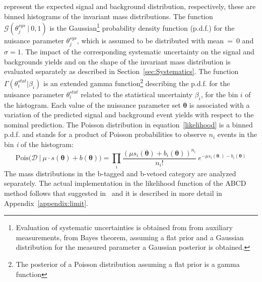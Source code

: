 represent the expected signal and background distribution, respectively, these are binned histograms
of the invariant \mmc mass distributions.
The function $\mathcal{G}(\theta_j^{sys} ~ | ~ 0, 1)$
is the  Gaussian\footnote{Evaluation of systematic uncertainties is obtained from from auxiliary measurements, from Bayes theorem,
	assuming a flat prior and a Gaussian distribution for the measured parameter a Gaussian posterior is obtained.	
}
probability density function (p.d.f.) for the nuisance parameter $\theta_j^{sys}$, 
which is assumed to be distributed with mean~=~0 and $\sigma = 1$.  The impact of the corresponding systematic uncertainty
on the  signal and backgrounds yields and on the shape of the \mmc invariant mass distribution
 is evaluated separately as described in Section~\ref{sec:Systematics}.
The function  $\Gamma(\theta^{stat}_i | \beta_i)$ is an extended gamma function\footnote{The posterior of a
	Poisson distribution assuming a flat prior is a gamma function}
describing the p.d.f. for the nuisance parameter $\theta^{stat}_i$ related 
to the statistical uncertainty $ \beta_i$, for the bin $i$ of the histogram.
Each value of the nuissance parameter set $\boldsymbol{\theta}$ is associated with a variation of the predicted
signal and background event yields with respect to the nominal prediction.
The Poisson distribution in equation~\eqref{likelihood} is a binned p.d.f. and 
stands for a product of Poisson probabilities to observe $n_i$ events in the bin \textit{i} of the \mmc histogram:
$$
 \text{Pois(}\mathcal{D} ~ | ~ \mu \cdot s(\boldsymbol{\theta}) + b(\boldsymbol{\theta})) = \prod_{i} \frac{(\mu s_i(\boldsymbol{\theta}) +b_i(\boldsymbol{\theta}))^{n_i}}{n_i!} ~ e^{-\mu s_i(\boldsymbol{\theta}.)
 -b_i(\boldsymbol{\theta})}
$$
The \mmc mass distributions in the b-tagged and b-vetoed category are analyzed separately.
The actual implementation in the likelihood function of the ABCD method follows that suggested in~\cite{ABCD}
and it is described in more detail in Appendix~\ref{appendix:limit}.

